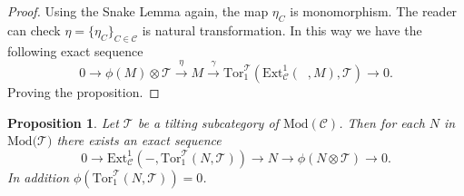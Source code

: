 \documentclass{amsart}
\theoremstyle{plain}
\newtheorem{proposition}{Proposition}
\numberwithin{equation}{section}
\begin{document}
\begin{proof}
Using the Snake Lemma again, the map $\eta _{C}$ is monomorphism. The reader
can check $\eta =\{\eta _{C}\}_{C\in \mathcal{C}}$ is natural
transformation. In this way we have the following exact sequence
\begin{equation*}
0\rightarrow \phi (M)\otimes \mathcal{T}\xrightarrow{\eta}M\xrightarrow{\gamma}\mathrm{Tor}_{1}^{\mathcal{T}}(\mathrm{Ext}_{\mathcal{C}}^{1}(\;\;,M),\mathcal{T})\rightarrow 0\text{.}
\end{equation*}Proving the proposition.
\end{proof}

\begin{proposition}
Let $\mathcal{T}$ be a tilting subcategory of $\mathrm{\mathrm{Mod}}(\mathcal{C})$. Then for each $N$ in $\mathrm{Mod}(\mathcal{T)}$ there exists
an exact sequence
\begin{equation*}
0\rightarrow \mathrm{Ext}_{\mathcal{C}}^{1}(-,\mathrm{Tor}^{\mathcal{T}}_1(N,\mathcal{T}))\rightarrow N\rightarrow \phi (N\otimes \mathcal{T})\rightarrow
0.
\end{equation*}In addition $\phi (\mathrm{Tor}_{1}^{\mathcal{T}}(N,\mathcal{T}))=0$.
\end{proposition}
\end{document}
